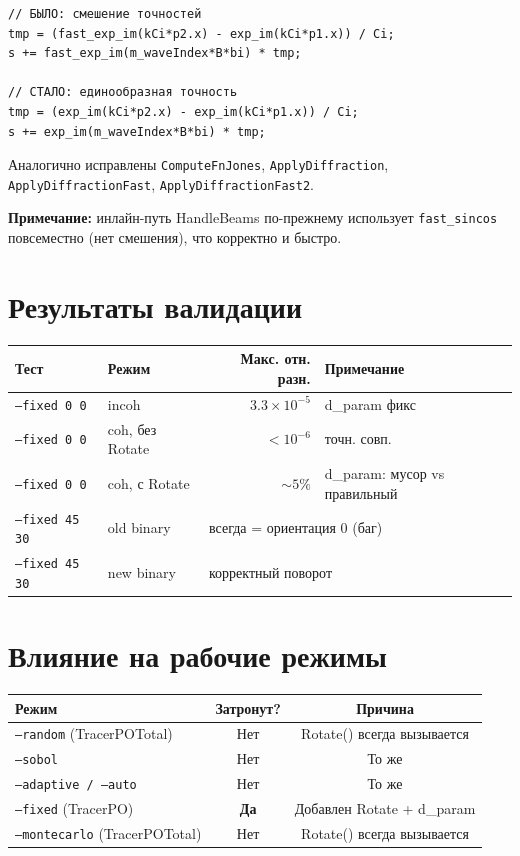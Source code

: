 \documentclass[a4paper,11pt]{article}
\begin{document}
\begin{lstlisting}
// БЫЛО: смешение точностей
tmp = (fast_exp_im(kCi*p2.x) - exp_im(kCi*p1.x)) / Ci;
s += fast_exp_im(m_waveIndex*B*bi) * tmp;

// СТАЛО: единообразная точность
tmp = (exp_im(kCi*p2.x) - exp_im(kCi*p1.x)) / Ci;
s += exp_im(m_waveIndex*B*bi) * tmp;
\end{lstlisting}

Аналогично исправлены \texttt{ComputeFnJones}, \texttt{ApplyDiffraction},
\texttt{ApplyDiffractionFast}, \texttt{ApplyDiffractionFast2}.

\textbf{Примечание:} инлайн-путь HandleBeams по-прежнему использует
\texttt{fast\_sincos} повсеместно (нет смешения), что корректно и быстро.

\section{Результаты валидации}

\begin{center}
\begin{tabular}{llrl}
\toprule
Тест & Режим & Макс. отн. разн. & Примечание \\
\midrule
\texttt{--fixed 0 0} & incoh & $3.3 \times 10^{-5}$ & d\_param фикс \\
\texttt{--fixed 0 0} & coh, без Rotate & $< 10^{-6}$ & точн. совп. \\
\texttt{--fixed 0 0} & coh, с Rotate & $\sim 5\%$ & d\_param: мусор vs правильный \\
\texttt{--fixed 45 30} & old binary & \multicolumn{2}{l}{всегда = ориентация 0 (баг)} \\
\texttt{--fixed 45 30} & new binary & \multicolumn{2}{l}{корректный поворот} \\
\bottomrule
\end{tabular}
\end{center}

\section{Влияние на рабочие режимы}

\begin{center}
\begin{tabular}{lcc}
\toprule
Режим & Затронут? & Причина \\
\midrule
\texttt{--random} (TracerPOTotal) & Нет & Rotate() всегда вызывается \\
\texttt{--sobol} & Нет & То же \\
\texttt{--adaptive / --auto} & Нет & То же \\
\texttt{--fixed} (TracerPO) & \textbf{Да} & Добавлен Rotate + d\_param \\
\texttt{--montecarlo} (TracerPOTotal) & Нет & Rotate() всегда вызывается \\
\bottomrule
\end{tabular}
\end{center}
\end{document}
